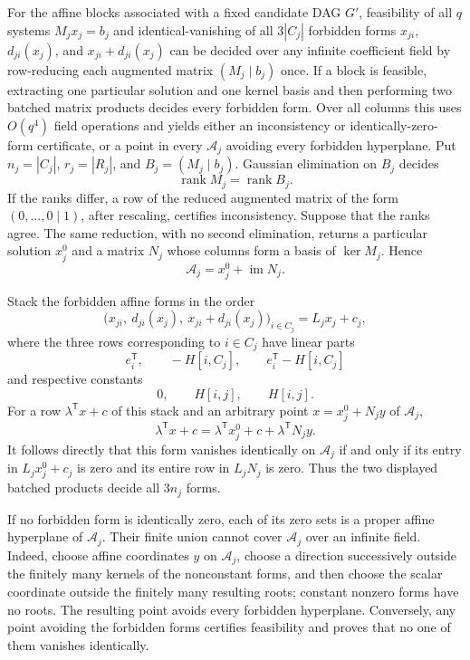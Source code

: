 For the affine blocks associated with a fixed candidate DAG \(G'\), feasibility of all \(q\) systems \(M_jx_j=b_j\) and identical-vanishing of all \(3|C_j|\) forbidden forms \(x_{ji}\), \(d_{ji}(x_j)\), and \(x_{ji}+d_{ji}(x_j)\) can be decided over any infinite coefficient field by row-reducing each augmented matrix \((M_j\mid b_j)\) once.  If a block is feasible, extracting one particular solution and one kernel basis and then performing two batched matrix products decides every forbidden form.  Over all columns this uses \(O(q^4)\) field operations and yields either an inconsistency or identically-zero-form certificate, or a point in every \(\mathcal A_j\) avoiding every forbidden hyperplane.
Put \(n_j=|C_j|\), \(r_j=|R_j|\), and \(B_j=(M_j\mid b_j)\).  Gaussian elimination on \(B_j\) decides
\[
 \operatorname{rank}M_j=\operatorname{rank}B_j.
\]
If the ranks differ, a row of the reduced augmented matrix of the form \((0,\ldots,0\mid 1)\), after rescaling, certifies inconsistency.  Suppose that the ranks agree.  The same reduction, with no second elimination, returns a particular solution \(x_j^0\) and a matrix \(N_j\) whose columns form a basis of \(\ker M_j\).  Hence
\[
 \mathcal A_j=x_j^0+\operatorname{im}N_j.
\]

Stack the forbidden affine forms in the order
\[
 \bigl(x_{ji},\ d_{ji}(x_j),\ x_{ji}+d_{ji}(x_j)\bigr)_{i\in C_j}
 =L_jx_j+c_j,
\]
where the three rows corresponding to \(i\in C_j\) have linear parts
\[
 e_i^{\mathsf T},\qquad -H[i,C_j],\qquad e_i^{\mathsf T}-H[i,C_j]
\]
and respective constants
\[
 0,\qquad H[i,j],\qquad H[i,j].
\]
For a row \(\lambda^{\mathsf T}x+c\) of this stack and an arbitrary point \(x=x_j^0+N_jy\) of \(\mathcal A_j\),
\[
 \lambda^{\mathsf T}x+c
 =\lambda^{\mathsf T}x_j^0+c+\lambda^{\mathsf T}N_jy.
\]
It follows directly that this form vanishes identically on \(\mathcal A_j\) if and only if its entry in \(L_jx_j^0+c_j\) is zero and its entire row in \(L_jN_j\) is zero.  Thus the two displayed batched products decide all \(3n_j\) forms.

If no forbidden form is identically zero, each of its zero sets is a proper affine hyperplane of \(\mathcal A_j\).  Their finite union cannot cover \(\mathcal A_j\) over an infinite field.  Indeed, choose affine coordinates \(y\) on \(\mathcal A_j\), choose a direction successively outside the finitely many kernels of the nonconstant forms, and then choose the scalar coordinate outside the finitely many resulting roots; constant nonzero forms have no roots.  The resulting point avoids every forbidden hyperplane.  Conversely, any point avoiding the forbidden forms certifies feasibility and proves that no one of them vanishes identically.

